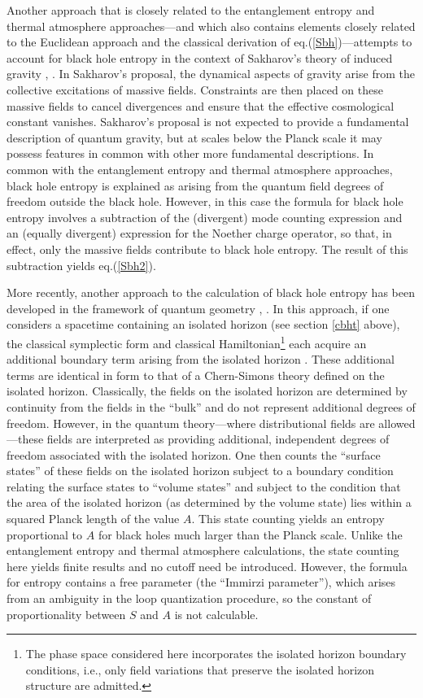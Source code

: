 \documentclass[12pt]{article}
\begin{document}
Another approach that is closely related to the entanglement entropy
and thermal atmosphere approaches---and which also contains elements
closely related to the Euclidean approach and the classical derivation
of eq.(\ref{Sbh})---attempts to account for black hole entropy in the
context of Sakharov's theory of induced gravity \cite{fro1},
\cite{fro2}. In Sakharov's proposal, the dynamical aspects of gravity
arise from the collective excitations of massive fields. Constraints
are then placed on these massive fields to cancel divergences and
ensure that the effective cosmological constant vanishes. Sakharov's
proposal is not expected to provide a fundamental description of
quantum gravity, but at scales below the Planck scale it may possess
features in common with other more fundamental descriptions. In common
with the entanglement entropy and thermal atmosphere approaches, black
hole entropy is explained as arising from the quantum field degrees of
freedom outside the black hole. However, in this case the formula for
black hole entropy involves a subtraction of the (divergent) mode
counting expression and an (equally divergent) expression for the
Noether charge operator, so that, in effect, only the massive fields
contribute to black hole entropy. The result of this subtraction
yields eq.(\ref{Sbh2}).

More recently, another approach to the calculation of black hole
entropy has been developed in the framework of quantum geometry
\cite{abck}, \cite{ak}. In this approach, if one considers a spacetime
containing an isolated horizon (see section \ref{cbht} above), the
classical symplectic form and classical Hamiltonian\footnote{The phase
space \cite{ack} considered here incorporates the isolated horizon
boundary conditions, i.e., only field variations that preserve the
isolated horizon structure are admitted.} each acquire an additional
boundary term arising from the isolated horizon \cite{afk}. These
additional terms are identical in form to that of a Chern-Simons
theory defined on the isolated horizon.  Classically, the fields on
the isolated horizon are determined by continuity from the fields in
the ``bulk'' and do not represent additional degrees of
freedom. However, in the quantum theory---where distributional fields
are allowed---these fields are interpreted as providing additional,
independent degrees of freedom associated with the isolated
horizon. One then counts the ``surface states'' of these fields on the
isolated horizon subject to a boundary condition relating the surface
states to ``volume states'' and subject to the condition that the area
of the isolated horizon (as determined by the volume state) lies
within a squared Planck length of the value $A$. This state counting
yields an entropy proportional to $A$ for black holes much larger than
the Planck scale. Unlike the entanglement entropy and thermal
atmosphere calculations, the state counting here yields finite results
and no cutoff need be introduced. However, the formula for entropy
contains a free parameter (the ``Immirzi parameter''), which arises
from an ambiguity in the loop quantization procedure, so the constant
of proportionality between $S$ and $A$ is not calculable.
\end{document}
